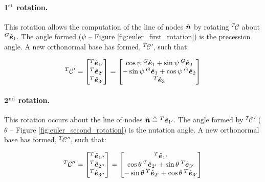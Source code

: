 \begin{appendices}
\paragraph{1$^{\rm st}$ rotation.} This rotation allows the computation of the line of nodes $\hat{\bm{n}}$ by rotating ${^T}{}\mathcal{C}$ about ${^G}{}\hat{\bm{e}}_1$. The angle formed ($\psi$ -- Figure \ref{fig:euler_first_rotation}) is the precession angle. A new orthonormal base has formed, ${^T}{}\mathcal{C}'$, such that:

\begin{equation}\label{eq:first_rotation}
    {^T}{}\mathcal{C}' = \begin{bmatrix} {^T}{}\hat{\bm{e}}_{1'} \\ {^T}{}\hat{\bm{e}}_{2'} \\ {^T}{}\hat{\bm{e}}_{3'} \end{bmatrix} = 
    \begin{bmatrix}
    \cos \psi \: {^G}{}\hat{\bm{e}}_1 + \sin \psi \: {^G}{}\hat{\bm{e}}_2 \\
    -\sin \psi \: {^G}{}\hat{\bm{e}}_1 + \cos \psi \: {^G}{}\hat{\bm{e}}_2 \\
    {^T}{}\hat{\bm{e}}_3
    \end{bmatrix}
\end{equation}

\paragraph{2$^{\rm nd}$ rotation.} This rotation occurs about the line of nodes $\hat{\bm{n}} \triangleq {^T}{}\hat{\bm{e}}_{1'}$. The angle formed by ${^T}{}\mathcal{C}'$ ($\theta$ -- Figure \ref{fig:euler_second_rotation}) is the nutation angle. A new orthonormal base has formed, ${^T}{}\mathcal{C}''$, such that:

\begin{equation}
    {^T}{}\mathcal{C}'' = \begin{bmatrix} {^T}{}\hat{\bm{e}}_{1''} \\ {^T}{}\hat{\bm{e}}_{2''} \\ {^T}{}\hat{\bm{e}}_{3''} \end{bmatrix} = 
    \begin{bmatrix}
    {^T}{}\hat{\bm{e}}_{1'}\\
    \cos \theta \: {^T}{}\hat{\bm{e}}_{2'} + \sin \theta \: {^T}{}\hat{\bm{e}}_{3'} \\
    -\sin \theta \: {^T}{}\hat{\bm{e}}_{2'} + \cos \theta \: {^T}{}\hat{\bm{e}}_{3'} \\
    \end{bmatrix}
\end{equation}


\end{appendices}
